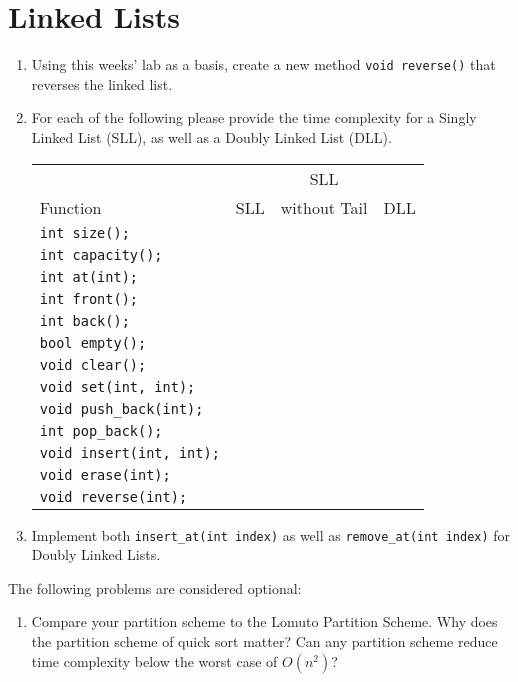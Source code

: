 \documentclass[11pt]{article}
\begin{document}
\section{Linked Lists} 
\begin{enumerate}
    \item Using this weeks' lab as a basis, create a new method \verb|void reverse()| that reverses the linked list.

    \item For each of the following please provide the time complexity for a Singly Linked List (SLL), as well as a Doubly Linked List (DLL). 
    
    \begin{tabular}{l | c | c | c}
                 &     & SLL          &  \\ 
        Function & SLL & without Tail & DLL \\ \hline
        \verb|int size();| & & & \\ \hline
        \verb|int capacity();| & & & \\ \hline
        \verb|int at(int);| & & & \\ \hline
        \verb|int front();| & & & \\ \hline
        \verb|int back();| & & & \\ \hline
        \verb|bool empty();| & & & \\ \hline
        \verb|void clear();| & & & \\ \hline
        \verb|void set(int, int);| & & & \\ \hline
        \verb|void push_back(int);| & & & \\ \hline
        \verb|int pop_back();| & & & \\ \hline
        \verb|void insert(int, int);| & & & \\ \hline
        \verb|void erase(int);| & & & \\ \hline
        \verb|void reverse(int);| & & & \\ \hline
    \end{tabular}

    \item Implement both \verb|insert_at(int index)| as well as \verb|remove_at(int index)| for Doubly Linked Lists.
\end{enumerate}

The following problems are considered optional:

\begin{enumerate}
    \item Compare your partition scheme to the Lomuto Partition Scheme. Why does the partition scheme of quick sort matter? Can any partition scheme reduce time complexity below the worst case of $O(n^2)$?
\end{enumerate}

\label{r:lastpage}
\end{document}
